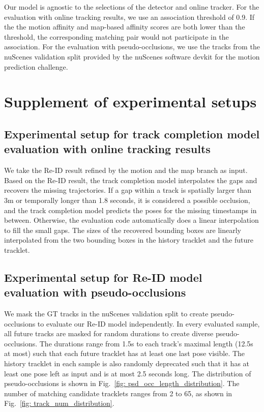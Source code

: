 \documentclass{article} \usepackage{iclr2023_conference,times}
\begin{document}
Our model is agnostic to the selections of the detector and online tracker. For the evaluation with online tracking results, we use an association threshold of 0.9. If the the motion affinity and map-based affinity scores are both lower than the threshold, the corresponding matching pair would not participate in the association. For the evaluation with pseudo-occlusions, we use the tracks from the nuScenes validation split provided by the nuScenes software devkit for the motion prediction challenge. 
\section{Supplement of experimental setups}
\label{sec: experimental setup}
\subsection{Experimental setup for track completion model evaluation with online tracking results}
\label{sec: Track completion evaluation online setup}
We take the Re-ID result refined by the motion and the map branch as input. Based on the Re-ID result, the track completion model interpolates the gaps and recovers the missing trajectories. If a gap within a track is spatially larger than 3m or temporally longer than 1.8 seconds, it is considered a possible occlusion, and the track completion model predicts the poses for the missing timestamps in between. Otherwise, the evaluation code automatically does a linear interpolation to fill the small gaps. The sizes of the recovered bounding boxes are linearly interpolated from the two bounding boxes in the history tracklet and the future tracklet. 
\subsection{Experimental setup for Re-ID model evaluation with pseudo-occlusions}
\label{sec: Re-ID evaluation pseudo-occ setup}
We mask the GT tracks in the nuScenes validation split to create pseudo-occlusions to evaluate our Re-ID model independently. In every evaluated sample, all future tracks are masked for random durations to create diverse pseudo-occlusions. The durations range from 1.5s to each track's maximal length (12.5s at most) such that each future tracklet has at least one last pose visible. The history tracklet in each sample is also randomly deprecated such that it has at least one pose left as input and is at most 2.5 seconds long. The distribution of pseudo-occlusions is shown in Fig.~\ref{fig: psd_occ_length_distribution}. The number of matching candidate tracklets ranges from 2 to 65, as shown in Fig.~\ref{fig: track_num_distribution}.
\end{document}
